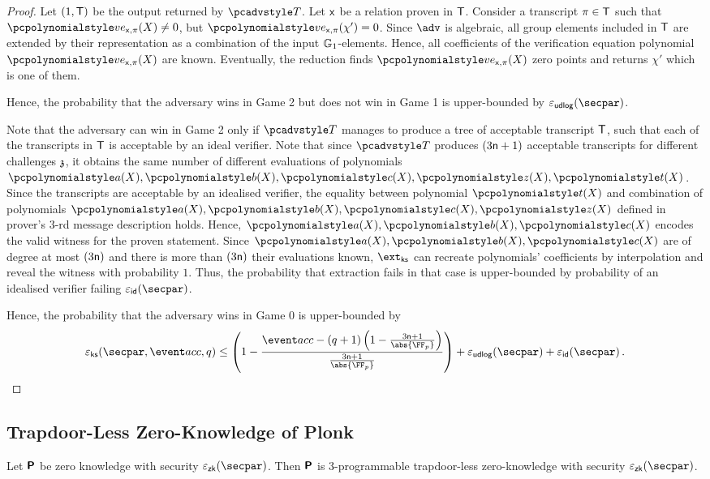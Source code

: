\begin{proof}
  Let $(1, \mathsf{T})$ be the output returned by $\tdv$. Let $\mathsf{x}$ be a relation proven in $\mathsf{T}$.  Consider a transcript $\pi \in \mathsf{T}$ such that $\vereq_{\inp, \zkproof}(X) \neq 0$, but $\vereq_{\inp, \zkproof}(\chi') = 0$. Since $\adv$ is algebraic, all group elements included in $\mathsf{T}$ are extended by their representation as a combination of the input $\mathbb{G}_1$-elements. Hence, all coefficients of the verification equation polynomial $\vereq_{\inp, \zkproof}(X)$ are known. 
  Eventually, the reduction finds $\vereq_{\inp, \zkproof}(X)$ zero points and returns $\chi'$ which is one of them.
    
  Hence, the probability that the adversary wins in Game 2 but does not win in Game 1 is upper-bounded by $\epsudlog (\secpar)$.

  Note that the adversary can win in Game 2 only if $\tdv$ manages to produce a tree of acceptable transcript $\mathsf{T}$, such that each of the transcripts in $\mathsf{T}$ is acceptable by an ideal verifier. Note that since $\tdv$ produces $(3 \mathsf{n} + 1)$ acceptable transcripts for different challenges $\mathfrak{z}$, it obtains the same number of different evaluations of polynomials $\p{a} (X), \p{b} (X), \p{c} (X), \p{z} (X), \p{t} (X)$. Since the transcripts are acceptable by an idealised verifier, the equality between polynomial $\p{t} (X)$ and combination of polynomials $\p{a} (X), \p{b} (X), \p{c} (X), \p{z} (X)$ defined in prover's $3$-rd message description holds. Hence, $\p{a} (X), \p{b} (X), \p{c} (X)$ encodes the valid witness for the proven statement. Since $\p{a} (X), \p{b} (X), \p{c} (X)$ are of degree at most $(3 \mathsf{n})$ and there is more than $(3 \mathsf{n})$ their evaluations known, $\extcss$ can recreate polynomials' coefficients by interpolation and reveal the witness with probability $1$. Thus, the probability that extraction fails in that case is upper-bounded by probability of an idealised verifier failing $\epsid(\secpar)$.

  Hence, the probability that the adversary wins in Game 0 is upper-bounded by 
  \[
    \epscss(\secpar,\accProb, q) \leq \left(1 - \frac{\accProb - (q + 1) \left(1 - \frac{3 \noofc + 1}{\abs{\FF_p}} \right)}{\frac{3 \noofc + 1}{\abs{\FF_p}}}\right) + \epsudlog (\secpar) + \epsid (\secpar)\,. 
  \]
 \end{proof}
  

\subsection{Trapdoor-Less Zero-Knowledge of Plonk}
\begin{lemma}
  \label{lem:plonk_tlzk}
  Let $\bm{\mathsf{P}}$ be zero knowledge with security $\epszk(\secpar)$. Then $\bm{\mathsf{P}}$ is 3-programmable trapdoor-less zero-knowledge
  with security $\epszk(\secpar)$.
\end{lemma}

